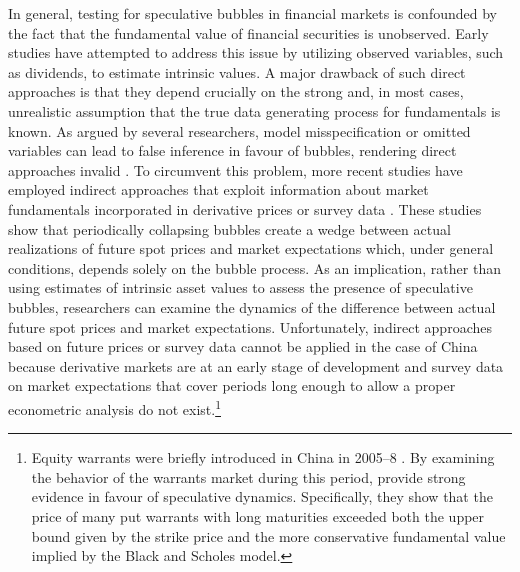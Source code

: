 \documentclass[11pt]{article}
\begin{document}
In general, testing for speculative bubbles in financial markets is confounded by the fact that the fundamental value of financial securities is unobserved. Early studies have attempted to address this issue by utilizing observed variables, such as dividends, to estimate intrinsic values. A major drawback of such direct approaches is that they depend crucially on the strong and, in most cases, unrealistic assumption that the true data generating process for fundamentals is known. As argued by several researchers, model misspecification or omitted variables can lead to false inference in favour of bubbles, rendering direct approaches invalid \citep{HamiltonW1985,floodG1994,Gurkaynak2008}. To circumvent this problem, more recent studies have employed indirect approaches that exploit information about market fundamentals incorporated in derivative prices or survey data \citep{pavlidisPPf2017,pavlidisPP2018}. These studies show that periodically collapsing bubbles create a wedge between actual realizations of future spot prices and market expectations which, under general conditions, depends solely on the bubble process. As an implication, rather than using estimates of intrinsic asset values to assess the presence of speculative bubbles, researchers can examine the dynamics of the difference between actual future spot prices and market expectations. Unfortunately, indirect approaches based on future prices or survey data cannot be applied in the case of China because derivative markets are at an early stage of development and survey data on market expectations that cover periods long enough to allow a proper econometric analysis do not exist.\footnote{Equity warrants were briefly introduced in China in 2005--8 \citep{liuZZ2014}. By examining the behavior of the warrants market during this period, \citet{XiongY2011} provide strong evidence in favour of speculative dynamics. Specifically, they show that the price of many put warrants with long maturities exceeded both the upper bound given by the strike price and the more conservative fundamental value implied by the Black and Scholes model.}  
\end{document}
